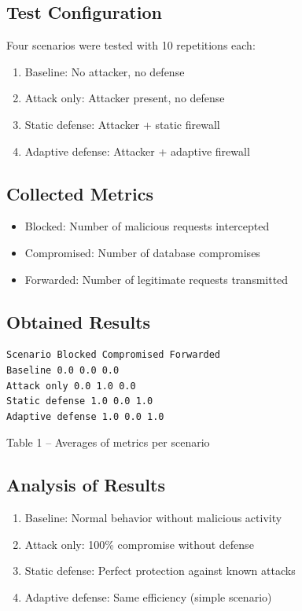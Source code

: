 \documentclass{article}
\begin{document}
\subsection{Test Configuration}
Four scenarios were tested with 10 repetitions each:
\begin{enumerate}
    \item Baseline: No attacker, no defense
    \item Attack only: Attacker present, no defense
    \item Static defense: Attacker + static firewall
    \item Adaptive defense: Attacker + adaptive firewall
\end{enumerate}

\subsection{Collected Metrics}
\begin{itemize}
    \item Blocked: Number of malicious requests intercepted
    \item Compromised: Number of database compromises
    \item Forwarded: Number of legitimate requests transmitted
\end{itemize}

\subsection{Obtained Results}
\begin{verbatim}
Scenario Blocked Compromised Forwarded
Baseline 0.0 0.0 0.0
Attack only 0.0 1.0 0.0
Static defense 1.0 0.0 1.0
Adaptive defense 1.0 0.0 1.0
\end{verbatim}
Table 1 – Averages of metrics per scenario

\subsection{Analysis of Results}
\begin{enumerate}
    \item Baseline: Normal behavior without malicious activity
    \item Attack only: 100\% compromise without defense
    \item Static defense: Perfect protection against known attacks
    \item Adaptive defense: Same efficiency (simple scenario)
\end{enumerate}
\end{document}
